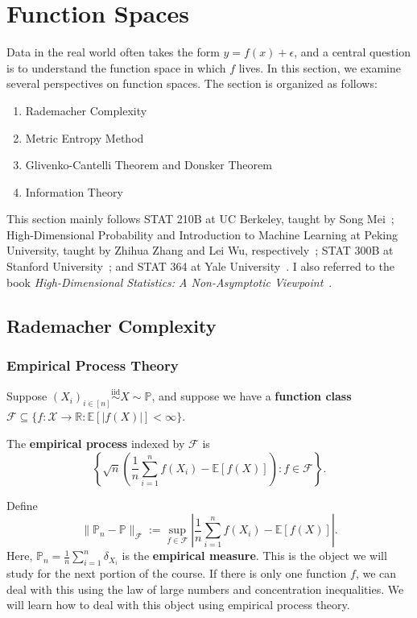 \newpage
\section{Function Spaces}
Data in the real world often takes the form $y=f(x)+\epsilon$, and a central question is to understand the function space in which $f$ lives. In this section, we examine several perspectives on function spaces. The section is organized as follows:

\begin{enumerate}
    \item Rademacher Complexity
    \item Metric Entropy Method
    \item Glivenko-Cantelli Theorem and Donsker Theorem
    \item Information Theory
\end{enumerate}

This section mainly follows STAT 210B at UC Berkeley, taught by Song Mei~\cite{meiBerkeleyStat210B}; High-Dimensional Probability and Introduction to Machine Learning at Peking University, taught by Zhihua Zhang and Lei Wu, respectively~\cite{zhangPkuHighDimensionalProbability,wuPkuIntroductionMachineLearning}; STAT 300B at Stanford University~\cite{duchiStanfordStats300B}; and STAT 364 at Yale University~\cite{wuYaleStat364}. I also referred to the book \emph{High-Dimensional Statistics: A Non-Asymptotic Viewpoint}~\cite{wainwright2019high}.

\subsection{Rademacher Complexity}
\subsubsection{Empirical Process Theory}
Suppose $(X_i)_{i \in [n]} \overset{\text{iid}}{\sim} X \sim \mathbb{P}$, and suppose we have a \textbf{function class} $\mathcal{F} \subseteq \{f : \mathcal{X} \to \mathbb{R} : \mathbb{E}[|f(X)|] < \infty\}$.

\begin{defn}
The \textbf{empirical process} indexed by $\mathcal{F}$ is
\[
\left\{ \sqrt{n} \left( \frac{1}{n} \sum_{i=1}^n f(X_i) - \mathbb{E}[f(X)] \right) : f \in \mathcal{F} \right\}.
\]
\end{defn}

Define
\[
\|\mathbb{P}_n - \mathbb{P}\|_{\mathcal{F}} := \sup_{f \in \mathcal{F}} \left| \frac{1}{n} \sum_{i=1}^n f(X_i) - \mathbb{E}[f(X)] \right|.
\]
Here, $\mathbb{P}_n = \frac{1}{n} \sum_{i=1}^n \delta_{X_i}$ is the \textbf{empirical measure}. This is the object we will study for the next portion of the course. If there is only one function $f$, we can deal with this using the law of large numbers and concentration inequalities. We will learn how to deal with this object using empirical process theory.


